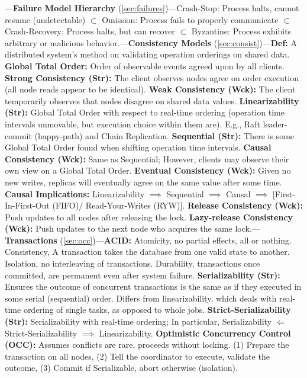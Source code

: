\newpage 

\begin{multicols}{2}

\noindent
---\textbf{Failure Model Hierarchy} (\ref{sec:failures})---Crash-Stop: Process halts, cannot resume (undetectable) $\subset$ Omission: Process fails to properly communicate $\subset$ 
Crash-Recovery: Process halts, but can recover $\subset$ Byzantine: Process exhibits arbitrary or malicious behavior.---\textbf{Consistency Models} (\ref{sec:consist})---\textbf{Def:} A distributed system's method on validating operation orderings on shared data.
\textbf{Global Total Order:} Order of observable events agreed upon by all clients. \textbf{Strong Consistency (Str):} The client observes nodes agree on order execution (all node reads appear to be identical).
\textbf{Weak Consistency (Wck):} The client temporarily observes that nodes disagree on shared data values.
\textbf{Linearizability (Str):} Global Total Order with respect to real-time ordering (operation time intervals unmovable, but execution choice within them are). E.g., Raft leader-commit (happy-path) and Chain Replication.
\textbf{Sequential (Str):} There is some Global Total Order found when shifting operation time intervals.
\textbf{Causal Consistency (Wck):} Same as Sequential; However, clients may observe their own view on a Global Total Order.
\textbf{Eventual Consistency (Wck):} Given no new writes, replicas will eventually agree on the same value after some time.
\textbf{Causal Implications:} Linearizability $\implies$ Sequential $\implies$ Causal $\implies$ [First-In-First-Out (FIFO)/ Read-Your-Writes (RYW)].
\textbf{Release Consistency (Wck):} Push updates to all nodes after releasing the lock. 
\textbf{Lazy-release Consistency (Wck):} Push updates to the next node who acquires the same
lock.---\textbf{Transactions} (\ref{sec:occ})---\textbf{ACID:} Atomicity, no partial effects, all or nothing. Consistency,  A transaction takes the database from one valid state to another. 
Isolation, no interleaving of transactions.
Durability, transactions once committed, are permanent even after system failure.
\textbf{Serializability (Str):} Ensures the outcome of concurrent transactions is the same as if they executed in some serial (sequential) order. Differs from 
linearizability, which deals with real-time ordering of single tasks, as opposed to whole jobs. 
\textbf{Strict-Serializability (Str):} Serializability with real-time ordering; In particular, Serializability $\Longleftarrow$ Strict-Serializability $\implies$ Linearizability.
\textbf{Optimistic Concurrency Control (OCC):} Assumes conflicts are rare, proceeds without locking. (1) Prepare the transaction on all nodes, (2) Tell the coordinator to execute, validate the outcome, (3) Commit if Serializable, abort otherwise (isolation).

\end{multicols}
